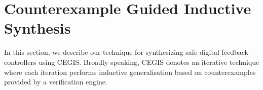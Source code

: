 \documentclass[sigconf]{llncs}
\begin{document}
\section{Counterexample Guided Inductive Synthesis} 
\label{ssec:cegis}

In this section, we describe our technique for synthesizing safe
digital feedback controllers using CEGIS. Broadly speaking, CEGIS
denotes an iterative technique where each iteration performs inductive
generalisation based on counterexamples provided by a verification
engine.




\end{document}

